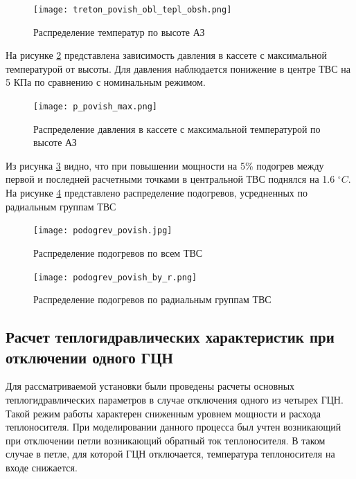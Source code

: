 \begin{figure}[H]
	\begin{center}
		\texttt{[image: treton\_povish\_obl\_tepl\_obsh.png]}
		\caption{Распределение температур по высоте АЗ}
		\label{pic:treton-povish-obl-tepl-obsh} %
	\end{center}
\end{figure}


На рисунке \ref{pic:p-povish-max} представлена зависимость давления в кассете с максимальной температурой от высоты. Для давления наблюдается понижение в центре ТВС на 5 КПа по сравнению с номинальным режимом. 


\begin{figure}[H]
	\begin{center}
		\texttt{[image: p\_povish\_max.png]}
		\caption{Распределение давления в кассете с максимальной температурой по высоте АЗ}
		\label{pic:p-povish-max} %
	\end{center}
\end{figure}

Из рисунка \ref{pic:podogrev-povish} видно, что при повышении мощности на 5\% подогрев между первой и последней расчетными точками в центральной ТВС поднялся на 1.6 $^\circ C$. На рисунке \ref{pic:podogrev-povish-by-r} представлено распределение подогревов, усредненных по радиальным группам ТВС


\begin{figure}[H]
	\begin{center}
		\texttt{[image: podogrev\_povish.jpg]}
		\caption{Распределение подогревов по всем ТВС}
		\label{pic:podogrev-povish} %
	\end{center}
\end{figure}

\begin{figure}[H]
	\begin{center}
		\texttt{[image: podogrev\_povish\_by\_r.png]}
		\caption{Распределение подогревов по радиальным группам ТВС}
		\label{pic:podogrev-povish-by-r} %
	\end{center}
\end{figure}


\subsection{Расчет теплогидравлических характеристик при отключении одного ГЦН}
Для рассматриваемой установки были проведены расчеты основных теплогидравлических параметров в случае отключения одного из четырех ГЦН. Такой режим работы характерен сниженным уровнем мощности и расхода теплоносителя. При моделировании данного процесса был учтен возникающий при отключении петли возникающий обратный ток теплоносителя. В таком случае в петле, для которой ГЦН отключается, температура теплоносителя на входе снижается. 

